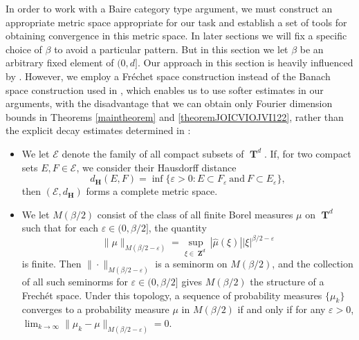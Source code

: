 \documentclass[dvipsnames,letterpaper,12pt]{article}
\numberwithin{equation}{section}
\DeclareMathOperator{\ZZ}{\mathbf{Z}}
\DeclareMathOperator{\TT}{\mathbf{T}}
\numberwithin{theorem}{section}
\begin{document}
In order to work with a Baire category type argument, we must construct an appropriate metric space appropriate for our task and establish a set of tools for obtaining convergence in this metric space. In later sections we will fix a specific choice of $\beta$ to avoid a particular pattern. But in this section we let $\beta$ be an arbitrary fixed element of $(0,d]$. Our approach in this section is heavily influenced by \cite{Korner2}. However, we employ a Fr\'{e}chet space construction instead of the Banach space construction used in \cite{Korner2}, which enables us to use softer estimates in our arguments, with the disadvantage that we can obtain only Fourier dimension bounds in Theorems \ref{maintheorem} and \ref{theoremJOICVIOJVI122}, rather than the explicit decay estimates determined in \cite{Korner2}:
%
\begin{itemize}
    \item We let $\mathcal{E}$ denote the family of all compact subsets of $\TT^d$. If, for two compact sets $E,F \in \mathcal{E}$, we consider their Hausdorff distance
    \[ d_\mathbf{H}(E,F) = \inf \{ \varepsilon > 0 : E \subset F_\varepsilon\ \text{and}\ F \subset E_\varepsilon \}, \]
    then $(\mathcal{E},d_\mathbf{H})$ forms a complete metric space. %

    \item We let $M(\beta/2)$ consist of the class of all finite Borel measures $\mu$ on $\TT^d$ such that for each $\varepsilon \in (0,\beta/2]$, the quantity
    \[ \| \mu \|_{M(\beta/2 - \varepsilon)} = \sup_{\xi \in \ZZ^d} |\widehat{\mu}(\xi)| |\xi|^{\beta/2 - \varepsilon} \]
    is finite. Then $\| \cdot \|_{M(\beta/2 - \varepsilon)}$ is a seminorm on $M(\beta/2)$, and the collection of all such seminorms for $\varepsilon \in (0,\beta/2]$ gives $M(\beta/2)$ the structure of a Frech\'{e}t space. Under this topology, a sequence of probability measures $\{ \mu_k \}$ converges to a probability measure $\mu$ in $M(\beta/2)$ if and only if for any $\varepsilon > 0$, $\lim_{k \to \infty} \| \mu_k - \mu \|_{M(\beta/2 - \varepsilon)} = 0$.
\end{itemize}
\end{document}
